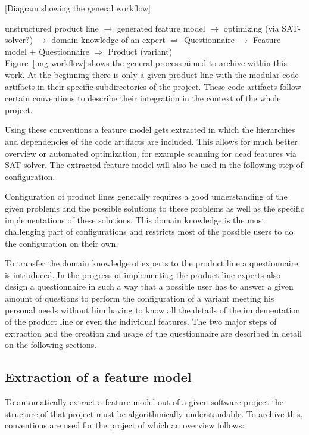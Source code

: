 [Diagram showing the general workflow]

unstructured product line $\rightarrow$ generated feature model $\rightarrow$ optimizing (via SAT-solver?) $\rightarrow$ domain knowledge of an expert $\Rightarrow$ Questionnaire $\rightarrow$ Feature model + Questionnaire $\Rightarrow$ Product (variant)\\

Figure~\ref{img-workflow} shows the general process aimed to archive within this work. At the beginning there is only a given product line with the modular code artifacts in their specific subdirectories of the project. These code artifacts follow certain conventions to describe their integration in the context of the whole project.

Using these conventions a feature model gets extracted in which the hierarchies and dependencies of the code artifacts are included. This allows for much better overview or automated optimization, for example scanning for dead features via SAT-solver. The extracted feature model will also be used in the following step of configuration.

Configuration of product lines generally requires a good understanding of the given problems and the possible solutions to these problems as well as the specific implementations of these solutions. This domain knowledge is the most challenging part of configurations and restricts most of the possible users to do the configuration on their own.

To transfer the domain knowledge of experts to the product line a questionnaire is introduced. In the progress of implementing the product line experts also design a questionnaire in such a way that a possible user has to answer a given amount of questions to perform the configuration of a variant meeting his personal needs without him having to know all the details of the implementation of the product line or even the individual features. The two major steps of extraction and the creation and usage of the questionnaire are described in detail on the following sections.


\subsection{Extraction of a feature model}
To automatically extract a feature model out of a given software project the structure of that project must be algorithmically understandable. To archive this, conventions are used for the project of which an overview follows:

